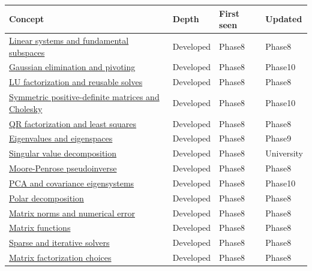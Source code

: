 {\def\LTcaptype{none} %
\begin{longtable}[]{@{}
  >{\raggedright\arraybackslash}p{}
  >{\raggedright\arraybackslash}p{}
  >{\raggedright\arraybackslash}p{}
  >{\raggedright\arraybackslash}p{}@{}}
\toprule\noalign{}
\begin{minipage}[b]{\linewidth}\raggedright
Concept
\end{minipage} & \begin{minipage}[b]{\linewidth}\raggedright
Depth
\end{minipage} & \begin{minipage}[b]{\linewidth}\raggedright
First seen
\end{minipage} & \begin{minipage}[b]{\linewidth}\raggedright
Updated
\end{minipage} \\
\midrule\noalign{}
\endhead
\bottomrule\noalign{}
\endlastfoot
\hyperref[appendix-8572a4a060c1]{Linear systems and fundamental subspaces} & Developed & Phase8 & Phase8 \\
\hyperref[appendix-f6e77f4a200f]{Gaussian elimination and pivoting} & Developed & Phase8 & Phase10 \\
\hyperref[appendix-55e4b5b0a1e6]{LU factorization and reusable solves} & Developed & Phase8 & Phase8 \\
\hyperref[appendix-50d2ea3c9b26]{Symmetric positive-definite matrices and Cholesky} & Developed & Phase8 & Phase10 \\
\hyperref[appendix-c3421e6b4f2c]{QR factorization and least squares} & Developed & Phase8 & Phase8 \\
\hyperref[appendix-0b3be18411f9]{Eigenvalues and eigenspaces} & Developed & Phase8 & Phase9 \\
\hyperref[appendix-1fad5e7f36fa]{Singular value decomposition} & Developed & Phase8 & University \\
\hyperref[appendix-541306fdbc1b]{Moore-Penrose pseudoinverse} & Developed & Phase8 & Phase8 \\
\hyperref[appendix-ad175ef3c5bf]{PCA and covariance eigensystems} & Developed & Phase8 & Phase10 \\
\hyperref[appendix-73f5bcf7a462]{Polar decomposition} & Developed & Phase8 & Phase8 \\
\hyperref[appendix-f8657bac66e5]{Matrix norms and numerical error} & Developed & Phase8 & Phase8 \\
\hyperref[appendix-0f4bc2bf2b1f]{Matrix functions} & Developed & Phase8 & Phase8 \\
\hyperref[appendix-67c87a3d9e94]{Sparse and iterative solvers} & Developed & Phase8 & Phase8 \\
\hyperref[appendix-221a483bec2d]{Matrix factorization choices} & Developed & Phase8 & Phase8 \\
\end{longtable}
}

